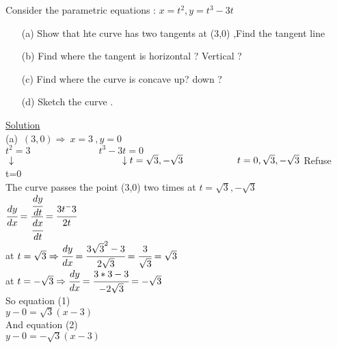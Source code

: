 \begin{example}
Consider the parametric equations : $x=t^2 , y=t^3-3t$
\begin{enumerate}
    \item[(a)] Show that hte curve has two tangents at (3,0) ,Find the tangent line
    \item[(b)]Find where the tangent is horizontal ? Vertical ?
    \item[(c)]Find where the curve is concave up? down ?
    \item[(d)]Sketch the curve .
\end{enumerate}
\underline{\textbf{\large}\color{smalt(darkpowderblue)}Solution} \\
(a)~$(3,0) \Rightarrow ~x=3 ~, y=0$\\$t^2=3 \hspace{3cm} t^3-3t=0$ $\\ \downarrow \hspace{4cm} \downarrow \\ t=\sqrt{3} , -\sqrt{3} \hspace{2cm} t=0 ,\sqrt{3} , -\sqrt{3} $ \hspace{1cm} {\color{red}Refuse t=0} \\
The curve passes the point (3,0) two times at $t=\sqrt{3} , -\sqrt{3} $ \\ 
$\cfrac{dy}{dx}=\cfrac{\cfrac{dy}{dt}}{\cfrac{dx}{dt}} = \cfrac{3t^-3}{2t}$ \\ 
at $t=\sqrt{3}\Rightarrow \cfrac{dy}{dx}=\cfrac{3\sqrt{3}^2-3}{2\sqrt{3}}=\cfrac{3}{\sqrt{3}}=\sqrt{3}$\\
at $t=-\sqrt{3}\Rightarrow \cfrac{dy}{dx}=\cfrac{3*3-3}{-2\sqrt{3}}=-\sqrt{3}$ \\
So equation (1) \\
$y-0=\sqrt{3}(x-3)$\\
And equation (2) \\
$y-0=-\sqrt{3}(x-3)$\\
\end{example}

\noindent{\color{smalt(darkpowderblue)}\rule{\linewidth}{.2mm}}
